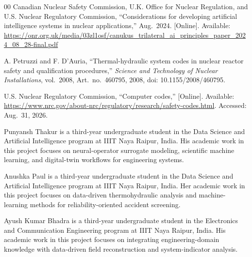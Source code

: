 \documentclass[journal]{IEEEtran}
\newcommand{\added}[1]{#1}
\begin{document}
\begin{thebibliography}{00}
 \added{Canadian Nuclear Safety Commission, U.K. Office for Nuclear Regulation, and U.S. Nuclear Regulatory Commission,
``Considerations for developing artificial intelligence systems in nuclear applications,'' Aug.~2024. [Online]. Available: \url{https://onr.org.uk/media/03zl1osf/canukus_trilateral_ai_principles_paper_2024_08_28-final.pdf}
}

\added{A. Petruzzi and F. D'Auria,
``Thermal-hydraulic system codes in nuclear reactor safety and qualification procedures,''
\textit{Science and Technology of Nuclear Installations}, vol.~2008, Art.~no.~460795, 2008, doi: 10.1155/2008/460795.}

\added{U.S. Nuclear Regulatory Commission,
``Computer codes,'' [Online]. Available: \url{https://www.nrc.gov/about-nrc/regulatory/research/safety-codes.html}. Accessed: Aug.~31, 2026.
}

\end{thebibliography}

\begin{IEEEbiographynophoto}{Punyansh Thakur}
is a third-year undergraduate student in the Data Science and Artificial Intelligence program at IIIT Naya Raipur, India. His academic work in this project focuses on neural-operator surrogate modeling, scientific machine learning, and digital-twin workflows for engineering systems.
\end{IEEEbiographynophoto}

\begin{IEEEbiographynophoto}{Anushka Paul}
is a third-year undergraduate student in the Data Science and Artificial Intelligence program at IIIT Naya Raipur, India. Her academic work in this project focuses on data-driven thermohydraulic analysis and machine-learning methods for reliability-oriented accident screening.
\end{IEEEbiographynophoto}

\begin{IEEEbiographynophoto}{Ayush Kumar Bhadra}
is a third-year undergraduate student in the Electronics and Communication Engineering program at IIIT Naya Raipur, India. His academic work in this project focuses on integrating engineering-domain knowledge with data-driven field reconstruction and system-indicator analysis.
\end{IEEEbiographynophoto}
\end{document}
